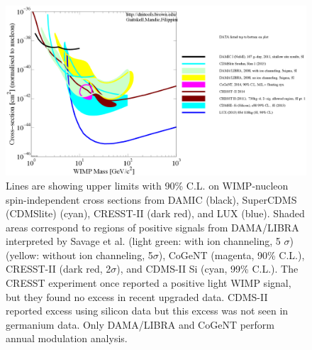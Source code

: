 \documentclass[12pt]{article}
\begin{document}
\begin{figure}[htb]
\centering
\includegraphics[height=8 cm]{limit_legend.eps}
\caption{Lines are showing upper limits with 90\% C.L. on WIMP-nucleon spin-independent cross sections from DAMIC \cite{Barreto:2011zu} (black),  SuperCDMS (CDMSlite) \cite{Agnese:2013jaa} (cyan), CRESST-II  \cite{Angloher:2014myn}(dark red), and LUX \cite{Akerib:2013tjd} (blue). Shaded areas correspond to regions of positive signals from DAMA/LIBRA interpreted by Savage et al. \cite{Savage:2008er} (light green: with ion channeling, 5 $\sigma$) (yellow: without ion channeling, 5$\sigma$), CoGeNT \cite{Aalseth:2014eft} (magenta, 90\% C.L.), CRESST-II \cite{Angloher:2011uu} (dark red, 2$\sigma$), and CDMS-II Si \cite{Agnese:2013rvf} (cyan, 99\% C.L.).  The CRESST experiment once reported a positive light WIMP signal, but they found no excess in recent upgraded data. CDMS-II reported excess using silicon data but this excess was not seen in germanium data.  Only DAMA/LIBRA and CoGeNT perform annual modulation analysis.
}
\label{fig:limit}
\end{figure}

\end{document}

